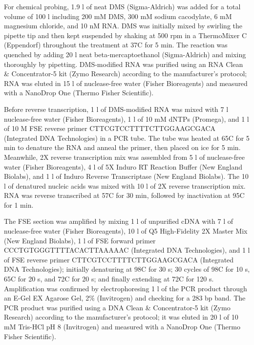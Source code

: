 \documentclass[main.tex]{subfiles}
\begin{document}
For chemical probing, 1.9 \textmu l of neat DMS (Sigma-Aldrich) was added for a total volume of 100 \textmu l including 200 mM DMS, 300 mM sodium cacodylate, 6 mM magnesium chloride, and 10 nM RNA.
DMS was initially mixed by swirling the pipette tip and then kept suspended by shaking at 500 rpm in a ThermoMixer C (Eppendorf) throughout the treatment at 37\textdegree C for 5 min.
The reaction was quenched by adding 20 \textmu l neat beta-mercaptoethanol (Sigma-Aldrich) and mixing thoroughly by pipetting.
DMS-modified RNA was purified using an RNA Clean \& Concentrator-5 kit (Zymo Research) according to the manufacturer's protocol; RNA was eluted in 15 \textmu l of nuclease-free water (Fisher Bioreagents) and measured with a NanoDrop One (Thermo Fisher Scientific).

Before reverse transcription, 1 \textmu l of DMS-modified RNA was mixed with 7 \textmu l nuclease-free water (Fisher Bioreagents), 1 \textmu l of 10 mM dNTPs (Promega), and 1 \textmu l of 10 \textmu M FSE reverse primer CTTCGTCCTTTTCTTGGAAGCGACA (Integrated DNA Technologies) in a PCR tube.
The tube was heated at 65\textdegree C for 5 min to denature the RNA and anneal the primer, then placed on ice for 5 min.
Meanwhile, 2X reverse transcription mix was assembled from 5 \textmu l of nuclease-free water (Fisher Bioreagents), 4 \textmu l of 5X Induro RT Reaction Buffer (New England Biolabs), and 1 \textmu l of Induro Reverse Transcriptase (New England Biolabs).
The 10 \textmu l of denatured nucleic acids was mixed with 10 \textmu l of 2X reverse transcription mix.
RNA was reverse transcribed at 57\textdegree C for 30 min, followed by inactivation at 95\textdegree C for 1 min.

The FSE section was amplified by mixing 1 \textmu l of unpurified cDNA with 7 \textmu l of nuclease-free water (Fisher Bioreagents), 10 \textmu l of Q5 High-Fidelity 2X Master Mix (New England Biolabs), 1 \textmu l of FSE forward primer CCCTGTGGGTTTTACACTTAAAAAC (Integrated DNA Technologies), and 1 \textmu l of FSE reverse primer CTTCGTCCTTTTCTTGGAAGCGACA (Integrated DNA Technologies); initially denaturing at 98\textdegree C for 30 s; 30 cycles of 98\textdegree C for 10 s, 65\textdegree C for 20 s, and 72\textdegree C for 20 s; and finally extending at 72\textdegree C for 120 s.
Amplification was confirmed by electrophoresing 1 \textmu l of the PCR product through an E-Gel EX Agarose Gel, 2\% (Invitrogen) and checking for a 283 bp band.
The PCR product was purified using a DNA Clean \& Concentrator-5 kit (Zymo Research) according to the manufacturer's protocol; it was eluted in 20 \textmu l of 10 mM Tris-HCl pH 8 (Invitrogen) and measured with a NanoDrop One (Thermo Fisher Scientific).
\end{document}
